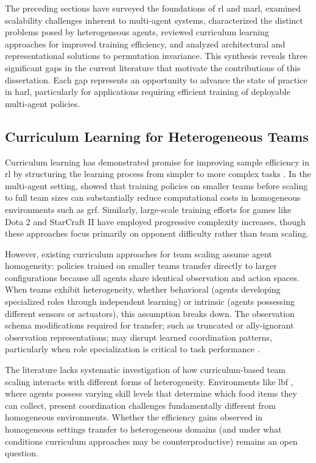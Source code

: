 The preceding sections have surveyed the foundations of \gls{rl} and \gls{marl}, 
examined scalability challenges inherent to multi-agent systems, 
characterized the distinct problems posed by heterogeneous agents, 
reviewed curriculum learning approaches for improved training efficiency, 
and analyzed architectural and representational solutions to permutation invariance. 
This synthesis reveals three significant gaps in the current literature that motivate 
the contributions of this dissertation. Each gap represents an opportunity to 
advance the state of practice in \gls{harl}, particularly for applications 
requiring efficient training of deployable multi-agent policies.

\subsection{Curriculum Learning for Heterogeneous Teams}
\label{sec:gap1}

Curriculum learning has demonstrated promise for improving sample efficiency 
in \gls{rl} by structuring the learning process from simpler to more complex 
tasks \cite{narvekar2020}. In the multi-agent setting, \cite{smit2023} 
showed that training policies on smaller teams before scaling to full 
team sizes can substantially reduce computational costs in homogeneous 
environments such as \gls{grf}. Similarly, large-scale training efforts 
for games like Dota 2 \cite{berner2019} and StarCraft II \cite{vinyals2019}
have employed progressive complexity increases, though these approaches 
focus primarily on opponent difficulty rather than team scaling.

However, existing curriculum approaches for team scaling assume agent homogeneity:
policies trained on smaller teams transfer directly to larger configurations 
because all agents share identical observation and action spaces.
When teams exhibit heterogeneity, whether behavioral 
(agents developing specialized roles through independent learning) 
or intrinsic (agents possessing different sensors or actuators), 
this assumption breaks down. 
The observation schema modifications required for transfer;
such as truncated or ally-ignorant observation representations;
may disrupt learned coordination patterns, particularly when role specialization 
is critical to task performance \cite{gupta2017, papoudakis2021}.

The literature lacks systematic investigation of how curriculum-based 
team scaling interacts with different forms of heterogeneity. 
Environments like \gls{lbf} \cite{papoudakis2021}, where agents 
possess varying skill levels that determine which food items they can collect,
present coordination challenges fundamentally different from homogeneous environments. 
Whether the efficiency gains observed in homogeneous settings transfer to heterogeneous domains
(and under what conditions curriculum approaches may be counterproductive)
remains an open question.

